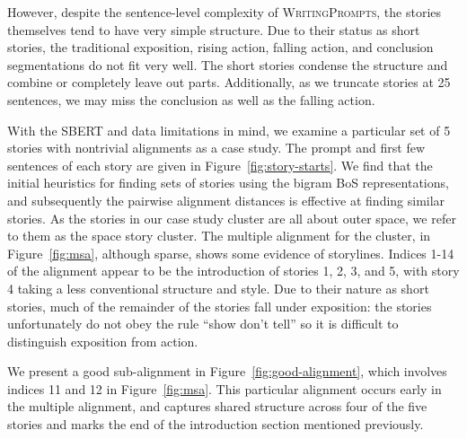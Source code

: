 \documentclass{article}
\begin{document}

However, despite the sentence-level complexity of \textsc{WritingPrompts},
the stories themselves tend to have very simple structure.
Due to their status as short stories, the traditional exposition, rising action,
falling action, and conclusion segmentations do not fit very well.
The short stories condense the structure and combine or completely leave out parts.
Additionally, as we truncate stories at 25 sentences, we may miss the conclusion
as well as the falling action.

With the SBERT and data limitations in mind, we examine a particular set of 5 stories 
with nontrivial alignments as a case study.
The prompt and first few sentences of each story are given in Figure~\ref{fig:story-starts}.
We find that the initial heuristics for finding sets of stories using the bigram BoS representations,
and subsequently the pairwise alignment distances is effective at finding similar stories.
As the stories in our case study cluster are all about outer space, we refer to them as
the space story cluster.
The multiple alignment for the cluster, in Figure~\ref{fig:msa},
although sparse, shows some evidence of storylines.
Indices 1-14 of the alignment appear to be the introduction of stories 1, 2, 3, and 5,
with story 4 taking a less conventional structure and style.
Due to their nature as short stories, much of the remainder of the stories fall under exposition:
the stories unfortunately do not obey the rule ``show don't tell''
so it is difficult to distinguish exposition from action.

We present a good sub-alignment in Figure~\ref{fig:good-alignment},
which involves indices 11 and 12 in Figure~\ref{fig:msa}.
This particular alignment occurs early in the multiple alignment,
and captures shared structure across four of the five stories
and marks the end of the introduction section mentioned previously.
\end{document}
